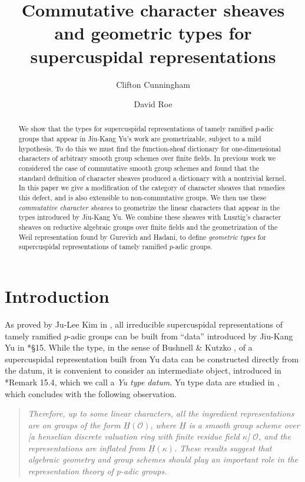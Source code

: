 \documentclass[10pt]{amsart}
\title[Commutative character sheaves and geometric types]{Commutative character sheaves and geometric types for supercuspidal representations}
\author{Clifton Cunningham}
\author{David Roe}
\theoremstyle{plain}
\theoremstyle{definition}
\begin{document}
\begin{abstract}
We show that the types for supercuspidal representations of tamely ramified $p$-adic groups that appear in Jiu-Kang Yu's work are geometrizable, subject to a mild hypothesis.
To do this we must find the function-sheaf dictionary for one-dimen\-sion\-al characters of arbitrary smooth group schemes over finite fields.  
In previous work we considered the case of commutative smooth group schemes and found that the standard definition of character sheaves produced a dictionary with a nontrivial kernel.  
In this paper we give a modification of the category of character sheaves that remedies this defect, and is also extensible to non-commutative groups.  
We then use these \emph{commutative character sheaves} to geometrize the linear characters that appear in the types introduced by Jiu-Kang Yu.
We combine these sheaves with Lusztig's character sheaves on reductive algebraic groups over finite fields and the geometrization of the Weil representation found by Gurevich and Hadani, to define \emph{geometric types} for supercuspidal representations of tamely ramified $p$-adic groups.
\end{abstract}

\maketitle

\tableofcontents

\section*{Introduction}

As proved by Ju-Lee Kim in \cite{kim:07a}, all irreducible supercuspidal representations of tamely ramified $p$-adic groups can be built from ``data'' introduced by Jiu-Kang Yu in \cite{yu:01a}*{\S 15}.
While the type, in the sense of Bushnell \& Kutzko \cite{bushnell-kutzko:98a}, of a supercuspidal representation built from Yu data can be constructed directly from the datum, it is convenient to consider an intermediate object, introduced in \cite{yu:01a}*{Remark 15.4}, which we call a \emph{Yu type datum}. 
Yu type data are studied in \cite{Yu:models}, which concludes with the following observation.
\begin{quotation}
{\it Therefore, up to some linear characters, all the ingredient representations 
 are on groups of the form $\underline{H}(\mathcal{O})$, where $\underline{H}$ is a smooth group scheme over [a henselian discrete valuation ring with finite residue field $\kappa$] $\mathcal{O}$, and the representations are inflated from $\underline{H}(\kappa)$. These results suggest that algebraic geometry and group schemes should play an
important role in the representation theory of $p$-adic groups.}
\end{quotation}
\end{document}
